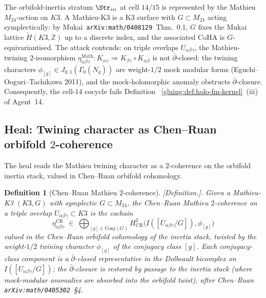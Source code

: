 \documentclass[11pt]{amsart}
\newtheorem{definition}[theorem]{Definition}
\providecommand{\Z}{\mathbb{Z}}
\providecommand{\ClaimStatusDefinition}{[\emph{Definition.}]}
\begin{document}
The orbifold-inertia stratum $\Str_{iii}$ at cell $14$/$15$ is
represented by the Mathieu $M_{24}$-action on $K3$. A Mathieu-K3 is a
K3 surface with $G \subset M_{24}$ acting symplectically: by
Mukai~\texttt{arXiv:math/0408129}~Thm.~0.1, $G$ fixes the Mukai
lattice $\widetilde H(K3, \Z)$ up to a discrete index, and the
associated CoHA is $G$-equivariantised. The attack contends: on triple
overlaps $U_{\alpha \beta \gamma}$, the Mathieu-twining $2$-isomorphism
$\eta^{\mathrm{Math}}_{\alpha\beta\gamma}: K_{\alpha \gamma} \Rightarrow
K_{\beta \gamma} \circ K_{\alpha \beta}$ is not $\bar\partial$-closed:
the twining characters $\phi_{[g]} \in J_{0,1}(\Gamma_0(N_g))$ are
weight-$1/2$ mock modular forms (Eguchi--Ooguri--Tachikawa 2011), and
the mock-holomorphic anomaly obstructs $\bar\partial$-closure.
Consequently, the cell-$14$ cocycle fails Definition~%
\ref{gluing:def:holo-fm-kernel}~(iii) of Agent~14.

\subsection*{Heal: Twining character as Chen--Ruan orbifold
$2$-coherence}

The heal reads the Mathieu twining character as a $2$-coherence on the
orbifold inertia stack, valued in Chen--Ruan orbifold cohomology.

\begin{definition}[Chen--Ruan Mathieu $2$-coherence]
\label{def:R13-cr-2-coherence}
\ClaimStatusDefinition.
Given a Mathieu-K3 $(K3, G)$ with symplectic $G \subset M_{24}$, the
\emph{Chen--Ruan Mathieu $2$-coherence} on a triple overlap
$U_{\alpha \beta \gamma} \subset K3$ is the cochain
\[
  \eta_{\alpha \beta \gamma}^{\mathrm{CR}}
  \;\in\;
  \bigoplus_{[g] \in \mathrm{Conj}(G)}
  H^2_{\mathrm{CR}}\bigl(
  I([U_{\alpha\beta\gamma}/G]), \phi_{[g]}
  \bigr)
\]
valued in the Chen--Ruan orbifold cohomology of the inertia stack,
twisted by the weight-$1/2$ twining character $\phi_{[g]}$ of the
conjugacy class $[g]$. Each conjugacy-class component is a
$\bar\partial$-closed representative in the Dolbeault bicomplex on
$I([U_{\alpha\beta\gamma}/G])$; the $\bar\partial$-closure is
restored by passage to the inertia stack (where mock-modular anomalies
are absorbed into the orbifold twist), after Chen--Ruan
\texttt{arXiv:math/0405302}~\S 4.
\end{definition}
\end{document}
